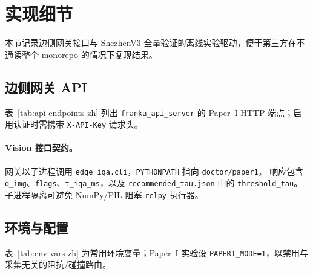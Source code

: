 \section{实现细节}
\label{sec:implementation-zh}

本节记录边侧网关接口与 ShezhenV3 全量验证的离线实验驱动，便于第三方在不通读整个 monorepo 的情况下复现结果。

\subsection{边侧网关 API}
表~\ref{tab:api-endpoints-zh} 列出 \texttt{franka\_api\_server} 的 Paper~I HTTP 端点；启用认证时需携带 \texttt{X-API-Key} 请求头。

\begin{table}[t]
\centering
\caption{边侧网关端点（Paper~I）。}
\label{tab:api-endpoints-zh}
\small
{}
\end{table}

\paragraph{Vision 接口契约。}
网关以子进程调用 \texttt{edge\_iqa.cli}，\texttt{PYTHONPATH} 指向 \texttt{doctor/paper1}。
响应包含 \texttt{q\_img}、\texttt{flags}、\texttt{t\_iqa\_ms}，以及 \texttt{recommended\_tau.json} 中的 \texttt{threshold\_tau}。
子进程隔离可避免 NumPy/PIL 阻塞 \texttt{rclpy} 执行器。

\subsection{环境与配置}
表~\ref{tab:env-vars-zh} 为常用环境变量；Paper~I 实验设 \texttt{PAPER1\_MODE=1}，以禁用与采集无关的阻抗/碰撞路由。

